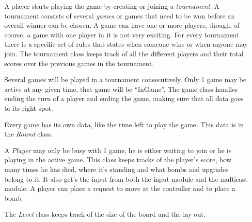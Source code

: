          \newpage

          A player starts playing the game by creating or joining a \emph{tournament}. A tournament consists of several \emph{games} or games that need to be won before an overall winner can be chosen. A game can have one or more players, though, of course, a game with one player in it is not very exciting. For every tournament there is a specific set of rules that states when someone wins or when anyone may join. The tournament class keeps track of all the different players and their total scores over the previous games in the tournament.

          Several games will be played in a tournament consecutively. Only 1 game may be active at any given time, that game will be ``InGame''. The game class handles ending the turn of a player and ending the game, making sure that all data goes to its right spot.

          Every game has its own data, like the time left to play the game. This data is in the \emph{Round} class.

          A \emph{Player} may only be busy with 1 game, he is either waiting to join or he is playing in the active game. This class keeps tracks of the player's score, how many times he has died, where it's standing and what bombs and upgrades belong to it. It also get's the input from both the input module and the multicast module. A player can place a request to move at the controller and to place a bomb.

          The \emph{Level} class keeps track of the size of the board and the lay-out.


